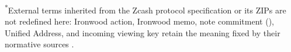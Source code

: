 \noindent\textsuperscript{*}External terms inherited from the Zcash protocol specification \cite{zcash-protocol} or its ZIPs are not redefined here: Ironwood action, Ironwood memo, note commitment (), Unified Address, and incoming viewing key retain the meaning fixed by their normative sources \cite{zip224,zip316,zcash-protocol}.